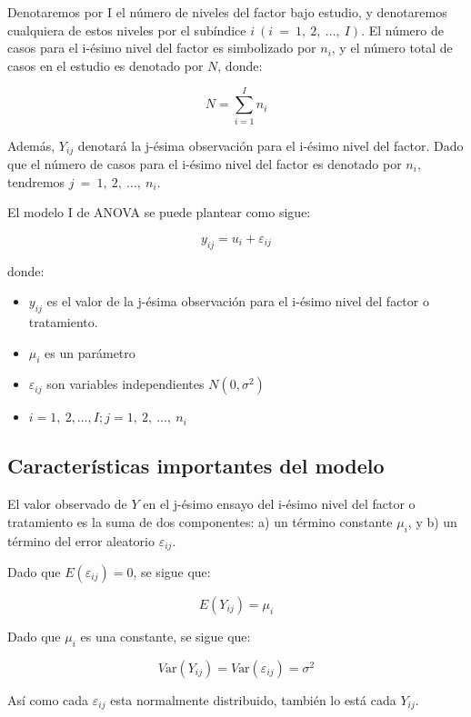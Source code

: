 \documentclass[]{book}
\theoremstyle{definition}
\theoremstyle{definition}
\theoremstyle{definition}
\theoremstyle{remark}
\begin{document}
Denotaremos por I el número de niveles del factor bajo estudio, y
denotaremos cualquiera de estos niveles por el subíndice
\(i\ (i\  = \ 1,\ 2,\ \ldots,\
I)\). El número de casos para el i-ésimo nivel del factor es simbolizado
por \(n_{i}\), y el número total de casos en el estudio es denotado por
\(N\), donde:

\[
N = \sum_{i = 1}^{I}n_{i}
\]

Además, \(Y_{ij}\) denotará la j-ésima observación para el i-ésimo nivel
del factor. Dado que el número de casos para el i-ésimo nivel del factor
es denotado por \(n_{i}\), tendremos \(j\  = \ 1,\ 2,\ \ldots,\ n_{i}\).

El modelo I de ANOVA se puede plantear como sigue:

\[
y_{ij} = u_{i} + \varepsilon_{ij}
\]

donde:

\begin{itemize}
\item
  \(y_{ij}\) es el valor de la j-ésima observación para el i-ésimo nivel
  del factor o tratamiento.
\item
  \(\mu_{i}\) es un parámetro
\item
  \(\varepsilon_{ij}\) son variables independientes \(N(0,\sigma^{2})\)
\item
  \(i = 1,\ 2,\ldots,I;j = 1,\ 2,\ \ldots,\ n_{i}\)
\end{itemize}

\hypertarget{caracteristicas-importantes-del-modelo}{%
\subsection{Características importantes del
modelo}\label{caracteristicas-importantes-del-modelo}}

El valor observado de \(Y\) en el j-ésimo ensayo del i-ésimo nivel del
factor o tratamiento es la suma de dos componentes: a) un término
constante \(\mu_{i}\), y b) un término del error aleatorio
\(\varepsilon_{ij}\).

Dado que \(E\left( \varepsilon_{ij} \right) = 0\), se sigue que:

\[
E\left( Y_{ij} \right) = \mu_{i}
\]

Dado que \(\mu_{i}\) es una constante, se sigue que:

\[
V\text{ar}\left( Y_{ij} \right) = V\text{ar}\left( \varepsilon_{ij} \right) = \sigma^{2}
\]

Así como cada \(\varepsilon_{ij}\) esta normalmente distribuido, también
lo está cada \(Y_{ij}\).
\end{document}
